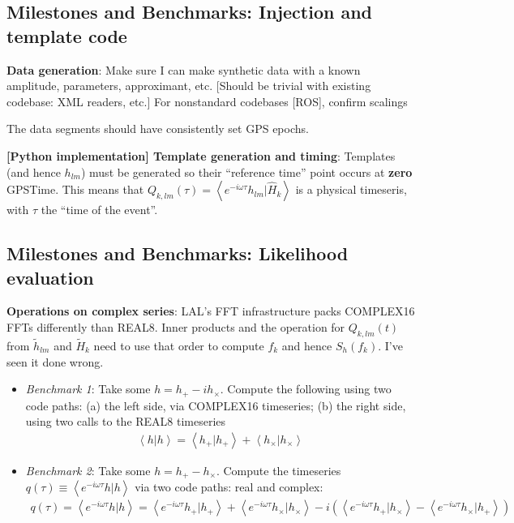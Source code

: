 \documentclass[twocolumn,prd,nofootinbib]{revtex4}
\newcommand\qmstateproduct[2]{\left\langle#1|#2\right\rangle}
\begin{document}
\begin{widetext}
\begin{widetext}
\subsection{Milestones and Benchmarks: Injection and template code }
\noindent \textbf{Data generation}: Make sure I can make synthetic data with a known amplitude, parameters, approximant, etc.  [Should be trivial with
  existing codebase: XML readers, etc.] For nonstandard codebases [ROS], confirm scalings

The data segments should have consistently set GPS epochs.


\noindent \textbf{[Python implementation] Template generation and timing}: Templates (and hence $h_{lm}$) must be
generated so their ``reference time'' point occurs at \textbf{zero} GPSTime.  This means that $Q_{k,lm}(\tau) = \qmstateproduct{e^{-i\omega \tau}h_{lm}}{\hat{H}_k}$ is a
physical timeseris, with $\tau$ the ``time of the event''.  
%


\subsection{Milestones and Benchmarks: Likelihood evaluation}

\noindent \textbf{Operations on complex series}: LAL's FFT infrastructure packs COMPLEX16 FFTs differently than REAL8.
Inner products and the operation for $Q_{k,lm}(t)$ from $\tilde{h}_{lm}$ and $\tilde{H}_k$ need to use that order to
compute $f_k$ and hence $S_h(f_k)$.  I've seen it done wrong.
\begin{itemize}
\item  \emph{Benchmark 1}: Take some $h=h_+-ih_\times$.  Compute the following using two code paths: (a) the left side,
  via COMPLEX16 timeseries; (b) the right side, using two calls to the REAL8 timeseries
\begin{eqnarray}
\qmstateproduct{h}{h}=\qmstateproduct{h_+}{h_+}+\qmstateproduct{h_\times}{h_\times}
\end{eqnarray}
\item \emph{Benchmark 2}: Take some $h=h_+-h_\times$.  Compute the timeseries $q(\tau)\equiv \qmstateproduct{e^{-i\omega
    \tau}h}{h}$ via two code paths: real and complex:
\begin{eqnarray}
q(\tau) = \qmstateproduct{e^{-i\omega \tau} h}{h} = 
\qmstateproduct{e^{-i\omega \tau}h_+}{h_+} + \qmstateproduct{e^{-i\omega \tau}h_\times}{h_\times}
-i(\qmstateproduct{e^{-i\omega \tau}h_+}{h_\times} - \qmstateproduct{e^{-i\omega \tau}h_\times}{h_+})
\end{eqnarray}
\end{itemize}


\end{widetext}
\end{widetext}
\end{document}
